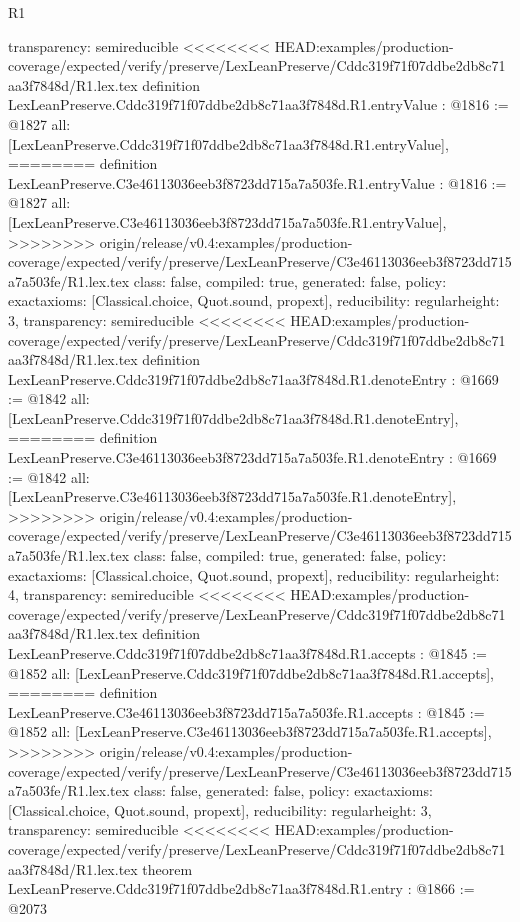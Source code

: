 \begin{lexlean}{R1}
\begin{coremodule}
{{{{{{{{{{{{{{{  transparency: semireducible
}
<<<<<<<< HEAD:examples/production-coverage/expected/verify/preserve/LexLeanPreserve/Cddc319f71f07ddbe2db8c71aa3f7848d/R1.lex.tex
definition LexLeanPreserve.Cddc319f71f07ddbe2db8c71aa3f7848d.R1.entryValue : @1816 := @1827 {
  all: [LexLeanPreserve.Cddc319f71f07ddbe2db8c71aa3f7848d.R1.entryValue],
========
definition LexLeanPreserve.C3e46113036eeb3f8723dd715a7a503fe.R1.entryValue : @1816 := @1827 {
  all: [LexLeanPreserve.C3e46113036eeb3f8723dd715a7a503fe.R1.entryValue],
>>>>>>>> origin/release/v0.4:examples/production-coverage/expected/verify/preserve/LexLeanPreserve/C3e46113036eeb3f8723dd715a7a503fe/R1.lex.tex
  class: false,
  compiled: true,
  generated: false,
  policy: exact{axioms: [Classical.choice, Quot.sound, propext]},
  reducibility: regular{height: 3},
  transparency: semireducible
}
<<<<<<<< HEAD:examples/production-coverage/expected/verify/preserve/LexLeanPreserve/Cddc319f71f07ddbe2db8c71aa3f7848d/R1.lex.tex
definition LexLeanPreserve.Cddc319f71f07ddbe2db8c71aa3f7848d.R1.denoteEntry : @1669 := @1842 {
  all: [LexLeanPreserve.Cddc319f71f07ddbe2db8c71aa3f7848d.R1.denoteEntry],
========
definition LexLeanPreserve.C3e46113036eeb3f8723dd715a7a503fe.R1.denoteEntry : @1669 := @1842 {
  all: [LexLeanPreserve.C3e46113036eeb3f8723dd715a7a503fe.R1.denoteEntry],
>>>>>>>> origin/release/v0.4:examples/production-coverage/expected/verify/preserve/LexLeanPreserve/C3e46113036eeb3f8723dd715a7a503fe/R1.lex.tex
  class: false,
  compiled: true,
  generated: false,
  policy: exact{axioms: [Classical.choice, Quot.sound, propext]},
  reducibility: regular{height: 4},
  transparency: semireducible
}
<<<<<<<< HEAD:examples/production-coverage/expected/verify/preserve/LexLeanPreserve/Cddc319f71f07ddbe2db8c71aa3f7848d/R1.lex.tex
definition LexLeanPreserve.Cddc319f71f07ddbe2db8c71aa3f7848d.R1.accepts : @1845 := @1852 {
  all: [LexLeanPreserve.Cddc319f71f07ddbe2db8c71aa3f7848d.R1.accepts],
========
definition LexLeanPreserve.C3e46113036eeb3f8723dd715a7a503fe.R1.accepts : @1845 := @1852 {
  all: [LexLeanPreserve.C3e46113036eeb3f8723dd715a7a503fe.R1.accepts],
>>>>>>>> origin/release/v0.4:examples/production-coverage/expected/verify/preserve/LexLeanPreserve/C3e46113036eeb3f8723dd715a7a503fe/R1.lex.tex
  class: false,
  generated: false,
  policy: exact{axioms: [Classical.choice, Quot.sound, propext]},
  reducibility: regular{height: 3},
  transparency: semireducible
}
<<<<<<<< HEAD:examples/production-coverage/expected/verify/preserve/LexLeanPreserve/Cddc319f71f07ddbe2db8c71aa3f7848d/R1.lex.tex
theorem LexLeanPreserve.Cddc319f71f07ddbe2db8c71aa3f7848d.R1.entry : @1866 := @2073 {
}}}}}}}}}}}}}}}}}}
\end{coremodule}
\end{lexlean}
